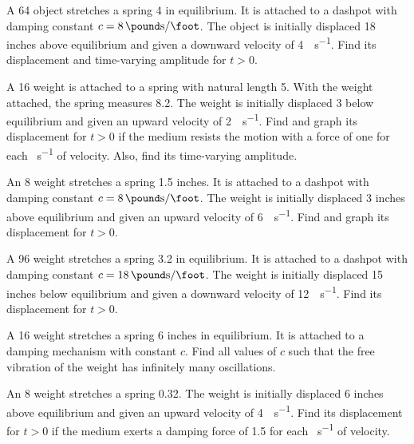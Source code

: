 \exercises
\begin{exerciselist}

\item\label{exer:6.2.1}A \qty{64}{\pound} object stretches a spring \qty{4}{\feet} in equilibrium. It is attached
to a dashpot with damping constant $c=\qty{8}{\pound\second\per\foot}$. The object is
initially displaced 18 inches above equilibrium and given a downward
velocity of \qty{4}{\feet\per\second}. Find its displacement and time-varying
amplitude for $t>0$.

\item\label{exer:6.2.2}\CGex
A \qty{16}{\pound} weight is attached to a spring with natural length \qty{5}{\feet}. With
the weight attached, the spring measures \qty{8.2}{\feet}. The weight is
initially displaced \qty{3}{\feet} below equilibrium and given an upward
velocity of \qty{2}{\feet\per\second}. Find and graph its displacement
 for $t>0$ if the medium resists the motion with a force of
one \unit{\pound} for each \unit{\foot\per\second} of velocity. Also, find its time-varying amplitude.

\item\label{exer:6.2.3}\CGex
An \qty{8}{\pound} weight stretches a spring 1.5 inches. It is attached to a
dashpot with damping constant $c=\qty{8}{\pound\second\per\foot}$. The weight is
initially displaced 3 inches above equilibrium and given an upward
velocity of \qty{6}{\feet\per\second}. Find and graph its displacement for $t>0$.

\item\label{exer:6.2.4}A \qty{96}{\pound} weight stretches a spring \qty{3.2}{\feet} in equilibrium. It is
attached to a dashpot with damping constant $c=\qty{18}{\pound\second\per\foot}$. The
weight is initially displaced 15 inches below equilibrium and given a
downward velocity of \qty{12}{\feet\per\second}. Find its displacement for $t>0$.

\item\label{exer:6.2.5}A \qty{16}{\pound} weight  stretches a spring 6 inches in equilibrium.
It is attached to a damping mechanism with constant $c$.  Find all values
of $c$ such that the free vibration of the weight has infinitely many
oscillations.

\item\label{exer:6.2.6}An \qty{8}{\pound} weight stretches a spring \qty{.32}{\feet}. The weight is initially
displaced 6 inches above equilibrium and given an upward velocity of \qty{4}{\feet\per\second}. Find its displacement for $t>0$ if the medium exerts a
damping force of \qty{1.5}{\pound} for each \unit{\foot\per\second} of velocity.


\end{exerciselist}

